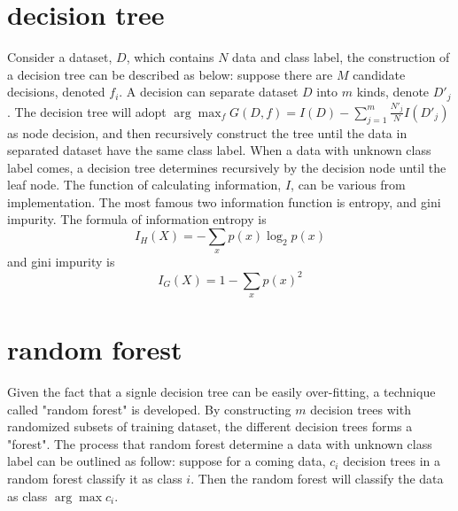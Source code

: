 \documentclass[twocolumn,10pt]{article}
\begin{document}
\section{decision tree}
  Consider a dataset, $D$, which contains $N$ data and class label, the construction of a decision tree can be described as 
  below: suppose there are $M$ candidate decisions, denoted $f_i$. A decision can separate dataset $D$ into $m$ kinds, denote 
  $D'_j$. The decision tree will adopt $\arg\max_{f} G(D, f)=I(D)-\sum^m_{j=1}\frac{N'_j}{N}I(D'_j)$ as node decision, 
  and then recursively construct the tree until the data in separated dataset have the same class label. 
  When a data with unknown class label comes, a decision tree determines recursively by the decision node until the leaf node.
  The function of calculating information, $I$, can be various from implementation. The most famous two information function is 
  entropy, and gini impurity. The formula of information entropy is 
  \begin{equation}
    I_H(X)=-\sum_{x}p(x)\log_2p(x) 
  \end{equation}
  and gini impurity is 
  \begin{equation}
    I_G(X)=1-\sum_{x}p(x)^2
  \end{equation}

\section{random forest}
  Given the fact that a signle decision tree can be easily over-fitting, a technique called "random forest" is developed. By 
  constructing $m$ decision trees with randomized subsets of training dataset, the different decision trees forms a "forest". 
  The process that random forest determine a data with unknown class label can be outlined as follow: suppose for a coming data, 
  $c_i$ decision trees in a random forest classify it as class $i$. Then the random forest will classify the data as class $\arg\max c_i$.
\end{document}
